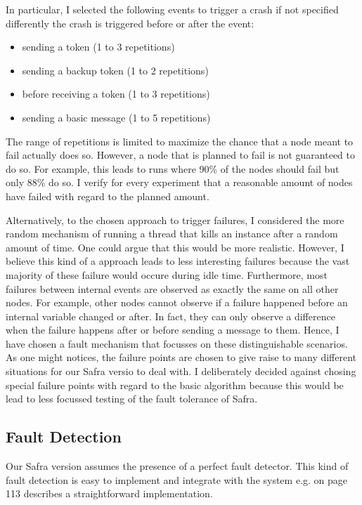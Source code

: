 	In particular, I selected the following events to trigger a crash if not specified differently the crash is triggered before or after the event:
	\begin{itemize}
	   	\item sending a token (1 to 3 repetitions)
	   	\item sending a backup token (1 to 2 repetitions)
	   	\item before receiving a token (1 to 3 repetitions)
	   	\item sending a basic message (1 to 5 repetitions)
	\end{itemize}
	The range of repetitions is limited to maximize the chance that a node meant to fail actually does so. 
	However, a node that is planned to fail is not guaranteed to do so.
	For example, this leads to runs where 90\% of the nodes should fail but only 88\% do so.
	I verify for every experiment that a reasonable amount of nodes have failed with regard to the planned amount.
	
	Alternatively, to the chosen approach to trigger failures, I considered the more random mechanism of running a thread that kills an instance after a random amount of time.
	One could argue that this would be more realistic.
	However, I believe this kind of a approach leads to less interesting failures because the vast majority of these failure would occure during idle time. 
	Furthermore, most failures between internal events are observed as exactly the same on all other nodes. 
	For example, other nodes cannot observe if a failure happened before an internal variable changed or after. 
	In fact, they can only observe a difference when the failure happens after or before sending a message to them.
	Hence, I have chosen a fault mechanism that focusses on these distinguishable scenarios.
	As one might notices, the failure points are chosen to give raise to many different situations for our Safra versio to deal with. 
	I deliberately decided against chosing special failure points with regard to the basic algorithm because this would be lead to less focussed testing of the fault tolerance of Safra.
	
\subsection{Fault Detection}
Our Safra version assumes the presence of a perfect fault detector.
This kind of fault detection is easy to implement and integrate with the system e.g.
\cite{fokkink:2018} on page 113 describes a straightforward implementation.

